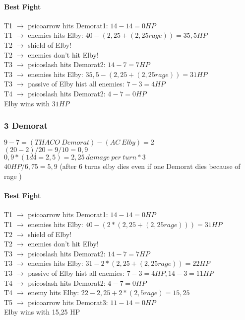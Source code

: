 \paragraph*{Best Fight\\}
T1 $\rightarrow$ psicoarrow hits Demorat1: $14-14 = 0 HP$\\
T1 $\rightarrow$ enemies hits Elby: $40 - (2,25+(2,25 rage)) = 35,5 HP$\\
T2 $\rightarrow$ shield of Elby!\\
T2 $\rightarrow$ enemies don’t hit Elby!\\
T3 $\rightarrow$ psicoslash hits Demorat2: $14 - 7 = 7 HP$\\
T3 $\rightarrow$ enemies hits Elby: $35,5 - (2,25+(2,25 rage)) = 31 HP$\\
T3 $\rightarrow$ passive of Elby hist all enemies: $7 - 3 = 4 HP$\\
T4 $\rightarrow$ psicoslash hits Demorat2: $4-7= 0 HP$\\
Elby wins with $31 HP$

\subsubsection*{3 Demorat}
$9-7 = (THACO\:Demorat) - (AC\:Elby) = 2$\\
$(20-2)/20 =9/10 = 0,9$\\
$0,9 * (1d4 = 2,5) = 2,25\:damage\:per\:turn * 3$\\
$40 HP / 6,75 = 5,9$ (after 6 turns elby dies even if one Demorat dies because of rage )


\paragraph*{Best Fight\\}
T1 $\rightarrow$ psicoarrow hits Demorat1: $14-14 = 0 HP$\\
T1 $\rightarrow$ enemies hits Elby: $40 - (2*(2,25+(2,25 rage))) = 31 HP$\\
T2 $\rightarrow$ shield of Elby!\\
T2 $\rightarrow$ enemies don’t hit Elby!\\
T3 $\rightarrow$ psicoslash hits Demorat2: $14 - 7 = 7 HP$\\
T3 $\rightarrow$ enemies hits Elby: $31 - 2*(2,25+(2,25 rage)) = 22 HP$\\
T3 $\rightarrow$ passive of Elby hist all enemies: $7 - 3 = 4 HP, 14 - 3 = 11 HP$\\
T4 $\rightarrow$ psicoslash hits Demorat2: $4-7= 0 HP$\\
T4 $\rightarrow$ enemy hits Elby: $22 - 2,25 + 2 * (2,5 rage) = 15,25$\\
T5 $\rightarrow$ psicoarrow hits Demorat3: $11 - 14 = 0 HP$\\
Elby wins with 15,25 HP

